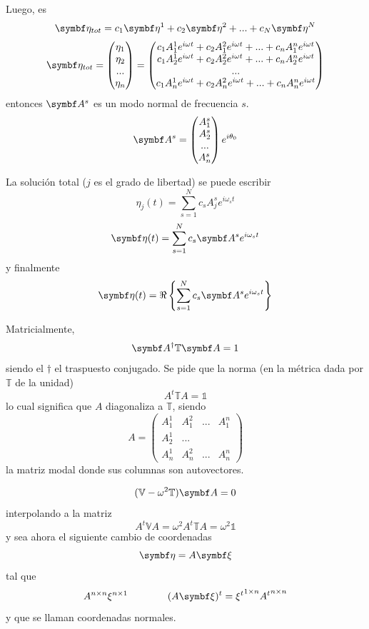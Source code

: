 \documentclass[10pt,oneside]{CBFT_book}
\begin{document}
Luego, es
\[
	\vb{\eta}_{tot} = c_1 \vb{\eta}^1 + c_2 \vb{\eta}^2 + ... + c_N \vb{\eta}^N
\]
\[
	\vb{\eta}_{tot} = \begin{pmatrix}
				\eta_1 \\
				\eta_2 \\
				... \\
				\eta_n 
	                  \end{pmatrix}
	                 = \begin{pmatrix}
				c_1 A_1^1 e^{i\omega t} + c_2 A_1^2 e^{i\omega t} + ... + c_n A_1^n e^{i\omega t} \\
				c_1 A_2^1 e^{i\omega t} + c_2 A_2^2 e^{i\omega t} + ... + c_n A_2^n e^{i\omega t} \\
				... \\
				c_1 A_n^1 e^{i\omega t} + c_2 A_n^2 e^{i\omega t} + ... + c_n A_n^n e^{i\omega t}
	                  \end{pmatrix}
\]
entonces $\vb{A}^s$ es un modo normal de frecuencia $s$.
\[
	\vb{A}^s = \begin{pmatrix}
	            A_1^s \\
	            A_2^s \\
	            ... \\
	            A_n^s
	           \end{pmatrix}
	           e^{i\theta_0}
\]

La solución total ($j$ es el grado de libertad) se puede escribir 
\[
	\eta_j(t) = \sum_{s=1}^N c_s A_j^s e^{i\omega_s t}
\]
\[
	\vb{\eta}(t) = \sum_{s=1}^N c_s \vb{A}^s e^{i\omega_s t}
\]
y finalmente 
\[
	\vb{\eta}(t) = \Re \left\{ \sum_{s=1}^N c_s \vb{A}^s e^{i\omega_s t} \right\}
\]

Matricialmente,
\[
	\vb{A}^\dagger \mathbb{T} \vb{A} = 1
\]
siendo el $\dagger$ el traspuesto conjugado. Se pide que la norma (en la métrica dada por $\mathbb{T}$ de la unidad)
\[
	A^t \mathbb{T} A = \mathbb{1}
\]
lo cual significa que $A$ diagonaliza a $\mathbb{T}$, siendo 
\[
	A = \begin{pmatrix}
	     A_1^1 & A_1^2 & ... & A_1^n \\
	     A_2^1 & ... \\
	     A_n^1 & A_n^2 & ... & A_n^n 
	    \end{pmatrix}
\]
la matriz modal donde sus columnas son autovectores.

\[
	(\mathbb{V} - \omega^2 \mathbb{T})\vb{A} = 0
\]
interpolando a la matriz 
\[
	A^t \mathbb{V} A = \omega^2 A^t \mathbb{T} A= \omega^2 \mathbb{1}
\]
y sea ahora el siguiente cambio de coordenadas
\[
	\vb{\eta} = A \vb{\xi}
\]
tal que 
\[
	A^{n\times n} \xi^{n\times 1} \qquad \qquad  (A \vb{\xi} )^t = {\xi^t}^{1 \times n} {A^t}^{n \times n}
\]
y que se llaman coordenadas normales.
\end{document}
